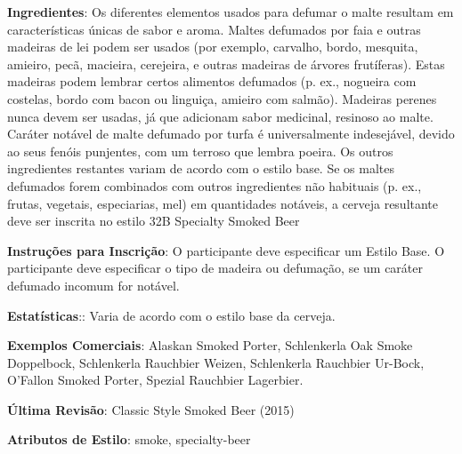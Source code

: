 \textbf{Ingredientes}: Os diferentes elementos usados para defumar o malte resultam em características únicas de sabor e aroma. Maltes defumados por faia e outras madeiras de lei podem ser usados (por exemplo, carvalho, bordo, mesquita, amieiro, pecã, macieira, cerejeira, e outras madeiras de árvores frutíferas). Estas madeiras podem lembrar certos alimentos defumados (p. ex., nogueira com costelas, bordo com bacon ou linguiça, amieiro com salmão). Madeiras perenes nunca devem ser usadas, já que adicionam sabor medicinal, resinoso ao malte. Caráter notável de malte defumado por turfa é universalmente indesejável, devido ao seus fenóis punjentes, com um terroso que lembra poeira. Os outros ingredientes restantes variam de acordo com o estilo base. Se os maltes defumados forem combinados com outros ingredientes não habituais (p. ex., frutas, vegetais, especiarias, mel) em quantidades notáveis, a cerveja resultante deve ser inscrita no estilo 32B Specialty Smoked Beer

\textbf{Instruções para Inscrição}: O participante deve especificar um Estilo Base. O participante deve especificar o tipo de madeira ou defumação, se um caráter defumado incomum for notável.

\textbf{Estatísticas}:: Varia de acordo com o estilo base da cerveja.

\textbf{Exemplos Comerciais}: Alaskan Smoked Porter, Schlenkerla Oak Smoke Doppelbock, Schlenkerla Rauchbier Weizen, Schlenkerla Rauchbier Ur-Bock, O’Fallon Smoked Porter, Spezial Rauchbier Lagerbier.

\textbf{Última Revisão}: Classic Style Smoked Beer (2015)

\textbf{Atributos de Estilo}: smoke, specialty-beer
